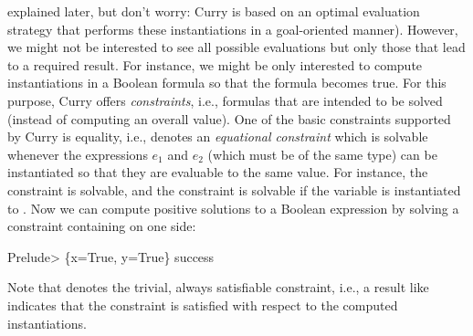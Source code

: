 explained later, but don't worry: Curry is based on an optimal
evaluation strategy \cite{AntoyEchahedHanus00JACM} that performs
these instantiations in a goal-oriented manner).
However, we might not be interested to see
all possible evaluations but only those that lead to a required
result. For instance, we might be only interested to compute
instantiations in a Boolean formula so that the formula becomes true.
For this purpose, Curry offers \emph{constraints},
i.e., formulas that are intended to be solved (instead of computing
an overall value). One of the basic constraints supported by Curry
is equality, i.e.,  denotes an
\emph{equational constraint}%
which is solvable whenever the expressions $e_1$ and $e_2$
(which must be of the same type) can be instantiated so that
they are evaluable to the same value. For instance,
the constraint  is solvable, and
the constraint  is solvable if the variable 
is instantiated to . Now we can compute positive solutions
to a Boolean expression by solving a constraint containing 
on one side:
\begin{prog}
Prelude> 
\{x=True, y=True\} success
\end{prog}
Note that 
denotes the trivial, always satisfiable
constraint, i.e., a result like  indicates that
the constraint is satisfied with respect to the computed instantiations.

